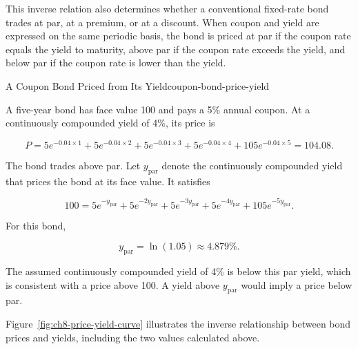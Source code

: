 This inverse relation also determines whether a conventional fixed-rate bond trades at par, at a premium, or at a discount. When coupon and yield are expressed on the same periodic basis, the bond is priced at par if the coupon rate equals the yield to maturity, above par if the coupon rate exceeds the yield, and below par if the coupon rate is lower than the yield.

\begin{example}{A Coupon Bond Priced from Its Yield}{coupon-bond-price-yield}

A five-year bond has face value 100 and pays a 5\% annual coupon. At a continuously compounded yield of 4\%, its price is

\[
P
=
5e^{-0.04\times1}
+
5e^{-0.04\times2}
+
5e^{-0.04\times3}
+
5e^{-0.04\times4}
+
105e^{-0.04\times5}
=
104.08.
\]

The bond trades above par. Let $y_{\mathrm{par}}$ denote the continuously compounded yield that prices the bond at its face value. It satisfies

\[
100
=
5e^{-y_{\mathrm{par}}}
+
5e^{-2y_{\mathrm{par}}}
+
5e^{-3y_{\mathrm{par}}}
+
5e^{-4y_{\mathrm{par}}}
+
105e^{-5y_{\mathrm{par}}}.
\]

For this bond,

\[
y_{\mathrm{par}}
=
\ln(1.05)
\approx
4.879\%.
\]

The assumed continuously compounded yield of 4\%
is below this par yield, which is consistent with
a price above 100. A yield above $y_{\mathrm{par}}$
would imply a price below par.

\end{example}

Figure~\ref{fig:ch8-price-yield-curve} illustrates
the inverse relationship between bond prices and
yields, including the two values calculated above.


